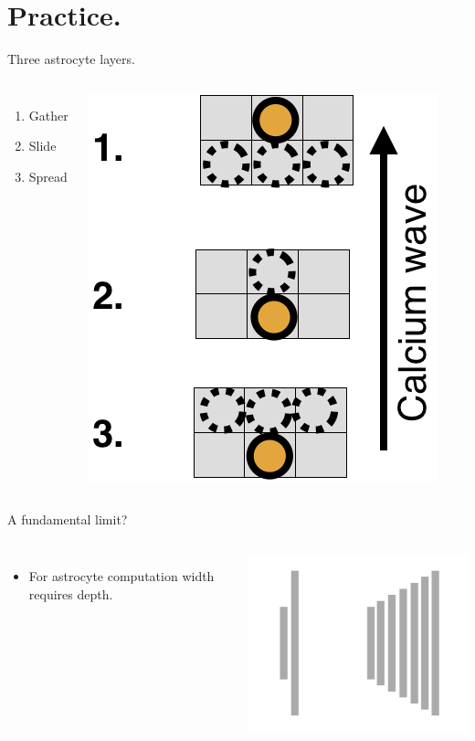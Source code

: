 \documentclass[10pt]{beamer}
\begin{document}
\section[In practice.]{Practice.}
\begin{frame}[fragile]{Three astrocyte layers.}
\begin{columns}
\begin{enumerate}
    \item Gather
    \item Slide
    \item Spread
\end{enumerate}
\centering
\includegraphics[scale=0.25]{images/layers.png} 
\end{columns}
\end{frame}

\begin{frame}[fragile]{A fundamental limit?}

\begin{columns}
\begin{itemize}
    \item For astrocyte computation \alert{width requires depth}.
\end{itemize}
\centering
\includegraphics[scale=0.5]{images/glaidim.png} 
\end{columns}

\end{frame}
\end{document}

